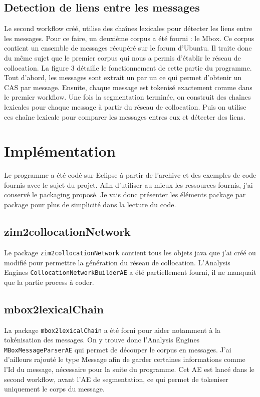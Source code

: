 \documentclass[a4paper]{article}
\begin{document}
	\subsection{Detection de liens entre les messages}

	Le second workflow créé, utilise des chaînes lexicales pour détecter les liens entre les messages. Pour ce faire, un deuxième corpus a été fourni : le Mbox. Ce corpus contient un ensemble de messages récupéré sur le forum d'Ubuntu. Il traite donc du même sujet que le premier corpus qui nous a permis d’établir le réseau de collocation. La figure 3 détaille le fonctionnement de cette partie du programme. Tout d'abord, les messages sont extrait un par un ce qui permet d'obtenir un CAS par message. Ensuite, chaque message est tokenisé exactement comme dans le premier workflow. Une fois la segmentation terminée, on construit des chaînes lexicales pour chaque message à partir du réseau de collocation. Puis on utilise ces chaîne lexicale pour comparer les messages entres eux et détecter des liens.
	
	\section{Implémentation}

Le programme a été codé sur Eclipse à partir de l'archive et des exemples de code fournis avec le sujet du projet. Afin d'utiliser au mieux les ressources fournis, j'ai conservé le packaging proposé. Je vais donc présenter les éléments package par package pour plus de simplicité dans la lecture du code. 

	\subsection{zim2collocationNetwork}
	Le package \texttt{zim2collocationNetwork} contient tous les objets java que j'ai créé ou modifié pour permettre la génération du réseau de collocation. L'Analysis Engines \texttt{CollocationNetworkBuilderAE} a été partiellement fourni, il ne manquait que la partie process à coder.

	\subsection{mbox2lexicalChain}
	La package \texttt{mbox2lexicalChain} a été forni pour aider notamment à la tokénisation des messages. On y trouve donc l'Analysis Engines \texttt{MBoxMessageParserAE} qui permet de découper le corpus en messages. J'ai d'ailleurs rajouté le type Message afin de garder certaines informations comme l’Id du message, nécessaire pour la suite du programme. Cet AE est lancé dans le second workflow, avant l'AE de segmentation, ce qui permet de tokeniser uniquement le corps du message.
\end{document}
